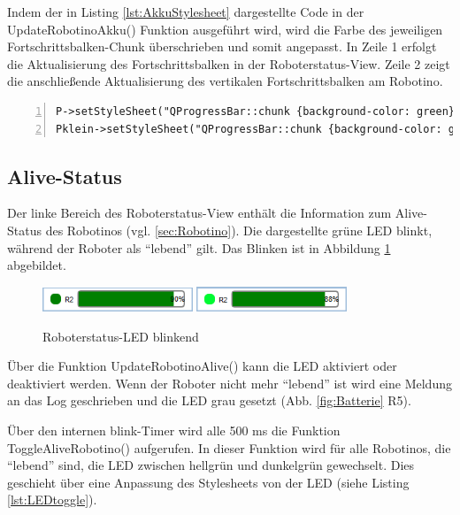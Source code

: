 Indem der in Listing \ref{lst:AkkuStylesheet} dargestellte Code in der UpdateRobotinoAkku() Funktion ausgeführt wird, wird die Farbe des jeweiligen Fortschrittsbalken-Chunk überschrieben und somit angepasst. In Zeile 1 erfolgt die Aktualisierung des Fortschrittsbalken in der Roboterstatus-View. Zeile 2 zeigt die anschließende Aktualisierung des vertikalen Fortschrittsbalken am Robotino. 

\begin{lstlisting}[frame=single, breaklines=true, numbers=left, stepnumber=2, firstnumber=1, numberstyle = \tiny, caption=Stylesheet Aktualisierung der Akku-Progressbar ,label=lst:AkkuStylesheet]
P->setStyleSheet("QProgressBar::chunk {background-color: green}");
Pklein->setStyleSheet("QProgressBar::chunk {background-color: green}");
\end{lstlisting}

\subsection{Alive-Status}

Der linke Bereich des Roboterstatus-View enthält die Information zum Alive-Status des Robotinos (vgl. \ref{sec:Robotino}). Die dargestellte grüne LED blinkt, während der Roboter als "`lebend"' gilt. Das Blinken ist in Abbildung \ref{fig:Led} abgebildet. 

\begin{figure}[htb]
    \centering
    \includegraphics[width=0.4\textwidth]{Abbildungen/BatterieAlive1.png}
    \includegraphics[width=0.4\textwidth]{Abbildungen/BatterieAlive2.png}
    \caption{Roboterstatus-LED blinkend}		
    \label{fig:Led}
\end{figure}

Über die Funktion UpdateRobotinoAlive() kann die LED aktiviert oder deaktiviert werden. Wenn der Roboter nicht mehr "`lebend"' ist wird eine Meldung an das Log geschrieben und die LED grau gesetzt (Abb. \ref{fig:Batterie} R5). 


Über den internen blink-Timer wird alle 500 ms die Funktion ToggleAliveRobotino() aufgerufen. In dieser Funktion wird für alle Robotinos, die "`lebend"' sind, die LED zwischen hellgrün und dunkelgrün gewechselt. Dies geschieht über eine Anpassung des Stylesheets von der LED (siehe Listing \ref{lst:LEDtoggle}). 

